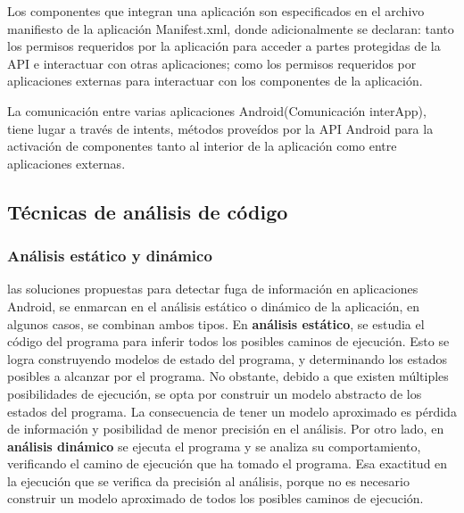 Los componentes que integran una aplicación son especificados en el archivo
manifiesto de la aplicación Manifest.xml\cite{App-Manifest}, donde
adicionalmente se declaran: tanto los permisos requeridos por la aplicación para
acceder a partes protegidas de la API\cite{Android-Permissions} e interactuar
con otras aplicaciones; como los permisos requeridos por aplicaciones
externas para interactuar con los componentes de la aplicación.

La comunicación entre varias aplicaciones Android(Comunicación interApp), tiene
lugar a través de intents\cite{App-Intent}, métodos proveídos por la API Android
para la activación de componentes tanto al interior de la aplicación como entre
aplicaciones externas. 

\subsection{Técnicas de análisis de código}
\subsubsection{Análisis estático y dinámico}
las soluciones propuestas para detectar fuga de información en aplicaciones
Android, se enmarcan en el análisis estático o dinámico de la aplicación, en
algunos casos, se combinan ambos tipos.\newline 
En \textbf{análisis estático}\cite{Static-dynamic}, se estudia el código del
programa para inferir todos los posibles caminos de ejecución. Esto se logra
construyendo modelos de estado del programa, y determinando los estados posibles
a alcanzar por el programa.
No obstante, debido a que existen múltiples posibilidades de ejecución, se opta
por construir un modelo abstracto de los estados del programa. La consecuencia
de tener un modelo aproximado es pérdida de información y posibilidad de menor
precisión en el análisis.\newline 
Por otro lado, en \textbf{análisis dinámico} se ejecuta el programa y se analiza
su comportamiento, verificando el camino de ejecución que ha tomado el programa.
Esa exactitud en la ejecución que se verifica da precisión al análisis, porque
no es necesario construir un modelo aproximado de todos los posibles caminos de
ejecución.

